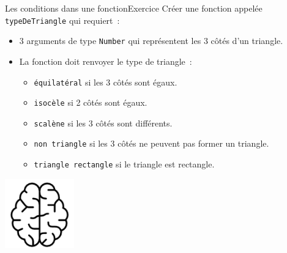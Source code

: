 \documentclass{beamer}
\begin{document}
\begin{frame}{Les conditions dans une fonction}{Exercice \execcounterdispinc{}}
    Créer une fonction appelée \lstinline{typeDeTriangle} qui requiert~:
    \begin{itemize}
        \item 3 arguments de type \lstinline{Number} qui représentent les 3 côtés d'un triangle.
        \item La fonction doit renvoyer le type de triangle~:
              \begin{itemize}
                  \item \lstinline{équilatéral} si les 3 côtés sont égaux.
                  \item \lstinline{isocèle} si 2 côtés sont égaux.
                  \item \lstinline{scalène} si les 3 côtés sont différents.
                  \item \lstinline{non triangle} si les 3 côtés ne peuvent pas former un triangle.
                  \item \lstinline{triangle rectangle} si le triangle est rectangle.
              \end{itemize}
    \end{itemize}
    \bigbreak
    \centering
    \includegraphics[width=3cm]{image/intelligence}
\end{frame}
\end{document}
